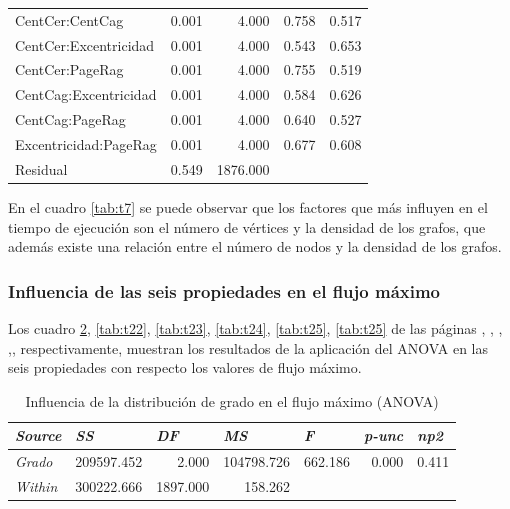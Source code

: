 \documentclass{article}
\begin{document}
\begin{table}[htbp]
\begin{tabular}{lrrrr}
    CentCer:CentCag & 0.001 & 4.000 & 0.758 & 0.517 \\
    CentCer:Excentricidad & 0.001 & 4.000 & 0.543 & 0.653 \\
    CentCer:PageRag & 0.001 & 4.000 & 0.755 & 0.519 \\
    CentCag:Excentricidad & 0.001 & 4.000 & 0.584 & 0.626 \\
    CentCag:PageRag & 0.001 & 4.000 & 0.640 & 0.527 \\
    Excentricidad:PageRag & 0.001 & 4.000 & 0.677 & 0.608 \\
    Residual & 0.549 & 1876.000 &       &  \\
    \end{tabular}%
  \label{tab:t20}%
\end{table}%

En el cuadro \ref{tab:t7} se puede observar que los factores que más influyen en el tiempo de ejecución son el número de vértices y la densidad de los grafos, que además existe una relación entre el número de nodos y la densidad de los grafos.

\subsubsection{Influencia de las seis propiedades en el flujo máximo}

Los cuadro \ref{tab:t21}, \ref{tab:t22}, \ref{tab:t23}, \ref{tab:t24}, \ref{tab:t25}, \ref{tab:t25} de las páginas \pageref{tab:t21}, \pageref{tab:t22}, \pageref{tab:t23}, \pageref{tab:t24},\pageref{tab:t25}, \pageref{tab:t26} respectivamente, muestran los resultados de la aplicación del ANOVA en las  seis propiedades con respecto los valores de flujo máximo.


\begin{table}[htbp]
  \centering
  \caption{Influencia de la distribución de grado en el flujo máximo (ANOVA)}
    \begin{tabular}{lrrrrrr}
    \toprule
    \textit{\textbf{Source}} & \multicolumn{1}{l}{\textit{\textbf{SS}}} & \multicolumn{1}{l}{\textit{\textbf{DF}}} & \multicolumn{1}{l}{\textit{\textbf{MS}}} & \multicolumn{1}{l}{\textit{\textbf{F}}} & \multicolumn{1}{l}{\textit{\textbf{p-unc}}} & \multicolumn{1}{l}{\textit{\textbf{np2}}} \\
    \midrule
    \textit{Grado} & 209597.452 & 2.000 & 104798.726 & 662.186 & 0.000 & 0.411 \\
    \textit{Within} & 300222.666 & 1897.000 & 158.262 &       &       &  \\
    \bottomrule
    \end{tabular}%
  \label{tab:t21}%
\end{table}%
\end{document}
